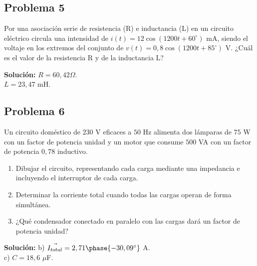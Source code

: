 \documentclass[
  a4paper,
  DIV=11,
  numbers=noendperiod]{scrreprt}
\providecommand{\tightlist}{%
  \setlength{\itemsep}{0pt}\setlength{\parskip}{0pt}}
\begin{document}
\subsection*{Problema 5}\label{problema-5}

Por una asociación serie de resistencia (R) e inductancia (L) en un
circuito eléctrico circula una intensidad de
\(i(t)=12 \cos(1200t+60^{\circ})\) mA, siendo el voltaje en los extremos
del conjunto de \(v(t)=0,8 \cos(1200t+85^{\circ})\) V. ¿Cuál es el valor
de la resistencia R y de la inductancia L?

\begin{tcolorbox}[enhanced jigsaw, breakable, colback=white, left=2mm, leftrule=.75mm, rightrule=.15mm, toprule=.15mm, colframe=quarto-callout-note-color-frame, arc=.35mm, bottomrule=.15mm, opacityback=0]

\textbf{Solución:} \(R = 60,42 \Omega\).\\
\(L = 23,47\) mH.

\end{tcolorbox}

\subsection*{Problema 6}\label{problema-6}

Un circuito doméstico de \(230\) V eficaces a \(50\) Hz alimenta dos
lámparas de \(75\) W con un factor de potencia unidad y un motor que
consume \(500\) VA con un factor de potencia \(0,78\) inductivo.

\begin{enumerate}
\def\labelenumi{\alph{enumi})}
\tightlist
\item
  Dibujar el circuito, representando cada carga mediante una impedancia
  e incluyendo el interruptor de cada carga.
\item
  Determinar la corriente total cuando todas las cargas operan de forma
  simultánea.
\item
  ¿Qué condensador conectado en paralelo con las cargas dará un factor
  de potencia unidad?
\end{enumerate}

\begin{tcolorbox}[enhanced jigsaw, breakable, colback=white, left=2mm, leftrule=.75mm, rightrule=.15mm, toprule=.15mm, colframe=quarto-callout-note-color-frame, arc=.35mm, bottomrule=.15mm, opacityback=0]

\textbf{Solución:} b) \(\vec{I_{total}} = 2,71\phase{-30,09^{\circ}}\)
A.\\
c) \(C = 18,6\) \(\mu\)F.

\end{tcolorbox}
\end{document}
